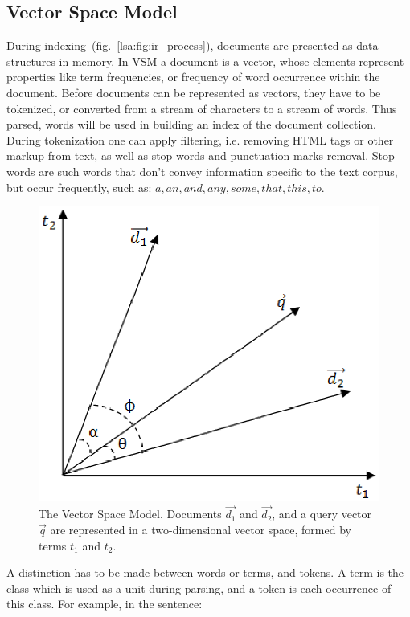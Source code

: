 \subsection{Vector Space Model}
\label{section_vsm}
During indexing~(fig.~\ref{lsa:fig:ir_process}), documents are presented as data structures in memory. In \gls{VSM} a document is a vector, whose elements represent  properties like term frequencies, or frequency of word occurrence within the document. Before documents can be represented as vectors, they have to be tokenized, or converted from a stream of characters to a stream of words. Thus parsed, words will be used in building an index of the document collection. During tokenization one can apply filtering, i.e. removing HTML tags or other markup from text, as well as stop-words and punctuation marks removal. Stop words are such words that don't convey information specific to the text corpus, but occur frequently, such as: $ a, an, and, any, some, that, this, to $. \\
%
%
\begin{figure}[H]
	\centering
	\includegraphics[scale=0.7]{img/vsm} 
	\caption[The Vector Space Model]%
           {The Vector Space Model. Documents $\vec{d_{1}}$ and $\vec{d_{2}}$, and a query vector $\vec{q}$ are represented in a two-dimensional vector space, formed by terms $t_{1}$ and $t_{2}$.}
\label{fig_vsm}
\end{figure}

A distinction has to be made between words or terms, and tokens. A term is the class which is used as a unit during parsing, and a token is each occurrence of this class. For example, in the sentence: 

